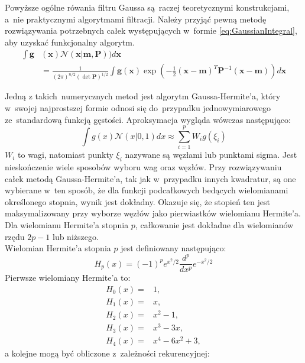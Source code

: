 \par
Powyższe ogólne rówania filtru Gaussa są~raczej teoretycznymi konstrukcjami, a~nie praktycznymi algorytmami filtracji. Należy przyjąć pewną metodę rozwiązywania potrzebnych całek występujących w~formie \ref{eq:GaussianIntegral}, aby uzyskać funkcjonalny algorytm.
\begin{align} \label{eq:GaussianIntegral}
	\int \boldsymbol{g}&(\boldsymbol{x})\mathcal{N}(\boldsymbol{x}|\boldsymbol{m},\boldsymbol{P})) d\boldsymbol{x}
	\nonumber \\
	&=\frac{1}{(2\pi)^{n/2}(\det\boldsymbol{P})^{1/2}}\int \boldsymbol{g}(\boldsymbol{x})\exp (-\frac{1}{2}(\boldsymbol{x - \boldsymbol{m}})^T\boldsymbol{P}^{-1}(\boldsymbol{x - \boldsymbol{m}})) d\boldsymbol{x}
\end{align}
\par
Jedną z takich~numerycznych metod jest algorytm Gaussa-Hermite'a, który w~swojej najprostszej formie odnosi się do~przypadku jednowymiarowego ze~standardową funkcją gęstości. Aproksymacja wygląda wówczas następująco:
\begin{equation}
	\int g(x)\mathcal{N}(x|0,1)dx \approx \sum_{i=1}^{p} W_i g(\xi_i)
\end{equation}
$W_i$ to wagi, natomiast punkty $\xi_i$ nazywane są węzłami lub punktami sigma. Jest nieskończenie wiele sposobów wyboru wag oraz węzłów. Przy rozwiązywaniu całek metodą Gaussa-Hermite'a, tak jak w~przypadku innych kwadratur, są one wybierane w~ten sposób, że dla funkcji podcałkowych bedących wielomianami określonego stopnia, wynik jest dokładny. Okazuje się, że stopień ten jest maksymalizowany przy wyborze węzłów jako pierwiastków wielomianu Hermite'a. Dla wielomianu Hermite'a stopnia $p$, całkowanie jest dokładne dla wielomianów rzędu $2p-1$ lub niższego.
\\
Wielomian Hermite'a stopnia $p$ jest definiowany następująco:
\begin{equation}
	H_p(x)=(-1)^pe^{x^2/2}\frac{d^p}{dx^p}e^{-x^2/2}
\end{equation}
Pierwsze wielomiany Hermite'a to:
\begin{align} \label{eq:FirstHermitePolynomials}
H_0(x)=&1, \nonumber \\
H_1(x)=&x, \nonumber \\
H_2(x)=&x^2-1, \nonumber \\
H_3(x)=&x^3-3x, \nonumber \\
H_4(x)=&x^4-6x^2+3,
\end{align}
a kolejne mogą być obliczone z~zależności rekurencyjnej:
